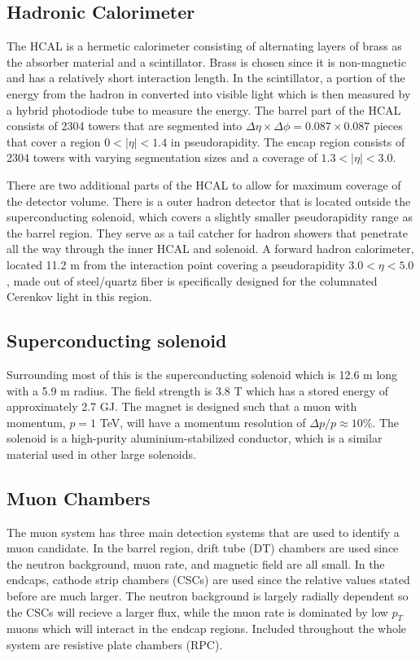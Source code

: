 \subsection{Hadronic Calorimeter}
\label{sec:HCAL}

The HCAL is a hermetic calorimeter consisting of alternating layers of brass as the absorber material and a scintillator. Brass is chosen since it is non-magnetic and has a relatively short interaction length. In the scintillator, a portion of the energy from the hadron in converted into visible light which is then measured by a hybrid photodiode tube to measure the energy. The barrel part of the HCAL consists of 2304 towers that are segmented into $\Delta\eta\times\Delta\phi=0.087\times0.087$ pieces that cover a region $0<|\eta|<1.4$ in pseudorapidity. The encap region consists of 2304 towers with varying segmentation sizes and a coverage of $1.3<|\eta|<3.0$. 

There are two additional parts of the HCAL to allow for maximum coverage of the detector volume. There is a outer hadron detector that is located outside the superconducting solenoid, which covers a slightly smaller pseudorapidity range as the barrel region. They serve as a tail catcher for hadron showers that penetrate all the way through the inner HCAL and solenoid. A forward hadron calorimeter, located 11.2 m from the interaction point covering a pseudorapidity $3.0<\eta<5.0$, made out of steel/quartz fiber is specifically designed for the columnated Cerenkov light in this region. 

\subsection{Superconducting solenoid}
\label{sec:Solenoid}

Surrounding most of this is the superconducting solenoid which is 12.6 m long with a 5.9 m radius. The field strength is 3.8 T which has a stored energy of approximately 2.7 GJ. The magnet is designed such that a muon with momentum, $p=1$ TeV, will have a momentum resolution of $\Delta p/p\approx10\%$. The solenoid is a high-purity aluminium-stabilized conductor, which is a similar material used in other large solenoids. 

\subsection{Muon Chambers}
\label{sec:muCham}

The muon system has three main detection systems that are used to identify a muon candidate. In the barrel region, drift tube (DT) chambers are used since the neutron background, muon rate, and magnetic field are all small. In the endcaps, cathode strip chambers (CSCs) are used since the relative values stated before are much larger. The neutron background is largely radially dependent so the CSCs will recieve a larger flux, while the muon rate is dominated by low $p_T$ muons which will interact in the endcap regions. Included throughout the whole system are resistive plate chambers (RPC). 

